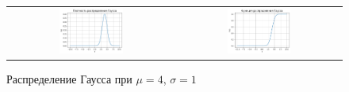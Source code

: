\begin{figure}[H]
    \centering
    \begin{tabular}{cc}
        \includegraphics[width=0.4\textwidth]{img/gauss/density_4_1.png}
        &
        \includegraphics[width=0.4\textwidth]{img/gauss/function_4_1.png}
    \end{tabular}
    \caption{Распределение Гаусса при $\mu = 4$, $\sigma = 1$}
    \label{fig:}
\end{figure}
